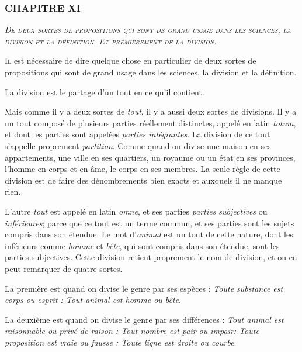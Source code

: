 \subsubsection{\centering \Large CHAPITRE XI}
\begin{center}\emph{\large\scshape De deux sortes de propositions qui sont de grand usage dans les sciences, la division et la définition. Et premièrement de la division.}\end{center}


	\lettrine{I}{l} est nécessaire de dire quelque chose en particulier de deux sortes de propositions qui sont de grand usage dans les sciences, la division et la définition.

La division est le partage d'un tout en ce qu'il contient.

Mais comme il y a deux sortes de \emph{tout}, il y a aussi deux sortes de divisions. Il y a un tout composé de plusieurs parties réellement distinctes, appelé en latin \emph{totum}, et dont les parties sont appelées \emph{parties intégrantes}. La division de ce tout s'appelle proprement \emph{partition}. Comme quand on divise une maison en ses appartements, une ville en ses quartiers, un royaume ou un état en ses provinces, l'homme en corps et en âme, le corps en ses membres. La seule règle de cette division est de faire des dénombrements bien exacts et auxquels il ne manque rien.

L'autre \emph{tout} est appelé en latin \emph{omne}, et ses parties \emph{parties subjectives} ou \emph{inférieures}; parce que ce tout est un terme commun, et ses parties sont les sujets compris dans son étendue. Le mot d'\emph{animal} est un tout de cette nature, dont les inférieurs comme \emph{homme} et \emph{bête}, qui sont compris dans son étendue, sont les parties subjectives. Cette division retient proprement le nom de division, et on en peut remarquer de quatre sortes.

La première est quand on divise le genre par ses espèces : \emph{Toute substance est corps ou esprit : Tout animal est homme ou bête}.

La deuxième est quand on divise le genre par ses différences : \emph{Tout animal est raisonnable ou privé de raison : Tout nombre est pair ou impair: Toute proposition est vraie ou fausse : Toute ligne est droite ou courbe}.

